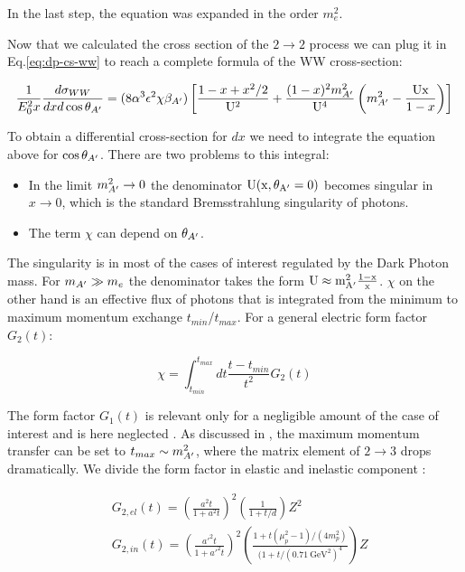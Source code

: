  In the last step, the equation was expanded in the order $m^2_e$.

 Now that we calculated the cross section of the $2 \to 2$ process we can plug it in Eq.\ref{eq:dp-cs-ww} to reach a complete formula of the WW cross-section:

 \begin{equation}
   \label{eq:dp-cs-ww-num}
   \frac{1}{E^2_0 x} \frac{d\sigma_{WW}}{dx d\cos{\theta_{A'}}} = (8 \alpha^3 \epsilon^2 \chi \beta_{A'}) \left[ \frac{1 - x + x^2/2}{\rm{U}^2} + \frac{(1-x)^2m^2_{A'}}{\rm{U}^4} \left(m^2_{A'} - \frac{\rm{U}x}{1 - x} \right) \right]
 \end{equation}

 To obtain a differential cross-section for $dx$ we need to integrate the equation above for $\cos{\theta_{A'}}$. There are two problems to this integral:

 \begin{itemize}
 \item In the limit $m^2_{A'} \to 0$ the denominator $\rm{U}(x, \theta_{A'} = 0)$ becomes singular in $x \to 0$, which is the standard Bremsstrahlung singularity of photons.   
 \item The term $\chi$ can depend on $\theta_{A'}$.
 \end{itemize}

 The singularity is in most of the cases of interest regulated by the Dark Photon mass. For $m_{A'} \gg m_e$ the denominator takes the form $\rm{U} \approx m^2_{A'} \frac{1-x}{x}$.
 $\chi$ on the other hand is an effective flux of photons that is integrated from the minimum to maximum momentum exchange $t_{min}$/$t_{max}$. For a general electric form factor $G_2(t)$:

 \begin{equation}
   \label{eq:g-ff}
   \chi = \int^{t_{max}}_{t_{min}} dt \frac{t - t_{min}}{t^2} G_2(t)
 \end{equation}

 The form factor $G_1(t)$ is relevant only for a negligible amount of the case of interest and is here neglected \cite{Kim:1973he}. As discussed in \cite{Kim:1973he,RevModPhys.46.815}, the maximum momentum transfer can be set to $t_{max} \sim m^2_{A'}$, where the matrix element of $2 \to 3$ drops dramatically. We divide the form factor in elastic and inelastic component \cite{jdb}:

 \begin{align}
   \label{eq:g-ff-el}
   &G_{2,el}(t) = \left( \frac{a^2 t}{1 + a^2t} \right)^2 \left( \frac{1}{1 + t/d}\right) Z^2\\
   \label{eq:g-ff-in}
   &G_{2,in}(t) = \left( \frac{a'^2 t }{1 + a'^2 t} \right)^2 \left( \frac{1 + t (\mu_p^2 -1) / (4m^2_p)}{(1 + t / (\SI{0.71}{\giga\electronvolt\squared})^4} \right) Z
 \end{align}

